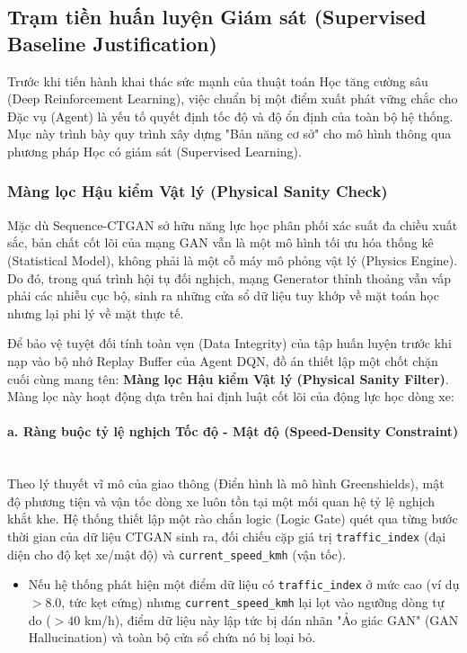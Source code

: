 \subsection{Trạm tiền huấn luyện Giám sát (Supervised Baseline Justification)}
\label{sec:5_4}

Trước khi tiến hành khai thác sức mạnh của thuật toán Học tăng cường sâu (Deep Reinforcement Learning), việc chuẩn bị một điểm xuất phát vững chắc cho Đặc vụ (Agent) là yếu tố quyết định tốc độ và độ ổn định của toàn bộ hệ thống. Mục này trình bày quy trình xây dựng "Bản năng cơ sở" cho mô hình thông qua phương pháp Học có giám sát (Supervised Learning).

\subsubsection{Màng lọc Hậu kiểm Vật lý (Physical Sanity Check)}

Mặc dù Sequence-CTGAN sở hữu năng lực học phân phối xác suất đa chiều xuất sắc, bản chất cốt lõi của mạng GAN vẫn là một mô hình tối ưu hóa thống kê (Statistical Model), không phải là một cỗ máy mô phỏng vật lý (Physics Engine). Do đó, trong quá trình hội tụ đối nghịch, mạng Generator thỉnh thoảng vẫn vấp phải các nhiễu cục bộ, sinh ra những cửa sổ dữ liệu tuy khớp về mặt toán học nhưng lại phi lý về mặt thực tế.

Để bảo vệ tuyệt đối tính toàn vẹn (Data Integrity) của tập huấn luyện trước khi nạp vào bộ nhớ Replay Buffer của Agent DQN, đồ án thiết lập một chốt chặn cuối cùng mang tên: \textbf{Màng lọc Hậu kiểm Vật lý (Physical Sanity Filter)}. Màng lọc này hoạt động dựa trên hai định luật cốt lõi của động lực học dòng xe:

\paragraph{a. Ràng buộc tỷ lệ nghịch Tốc độ - Mật độ (Speed-Density Constraint)} \mbox{} \\
Theo lý thuyết vĩ mô của giao thông (Điển hình là mô hình Greenshields), mật độ phương tiện và vận tốc dòng xe luôn tồn tại một mối quan hệ tỷ lệ nghịch khắt khe. Hệ thống thiết lập một rào chắn logic (Logic Gate) quét qua từng bước thời gian của dữ liệu CTGAN sinh ra, đối chiếu cặp giá trị \texttt{traffic\_index} (đại diện cho độ kẹt xe/mật độ) và \texttt{current\_speed\_kmh} (vận tốc).
\begin{itemize}
    \item Nếu hệ thống phát hiện một điểm dữ liệu có \texttt{traffic\_index} ở mức cao (ví dụ $> 8.0$, tức kẹt cứng) nhưng \texttt{current\_speed\_kmh} lại lọt vào ngưỡng dòng tự do ($> 40$ km/h), điểm dữ liệu này lập tức bị dán nhãn "Ảo giác GAN" (GAN Hallucination) và toàn bộ cửa sổ chứa nó bị loại bỏ.
\end{itemize}

